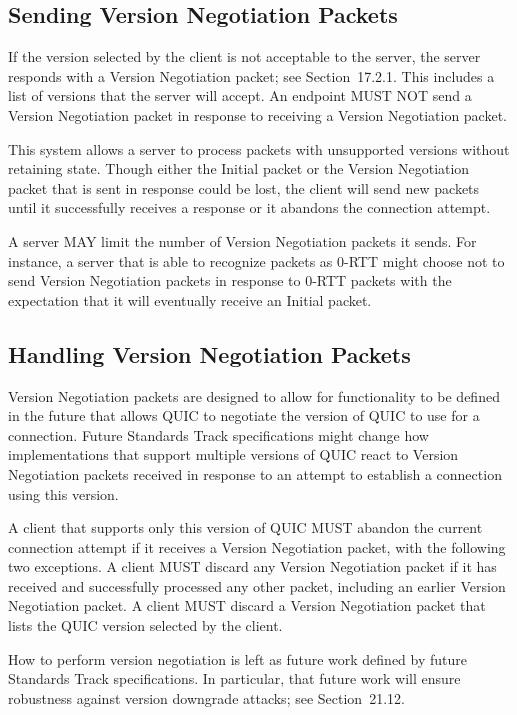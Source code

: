 \documentclass{article}
\begin{document}
\subsection{Sending Version Negotiation Packets}

If the version selected by the client is not acceptable to the server, the server responds with a Version Negotiation packet; see Section~17.2.1.  This includes a list of versions that the server will accept.  An endpoint MUST NOT send a Version Negotiation packet in response to receiving a Version Negotiation packet.

This system allows a server to process packets with unsupported versions without retaining state.  Though either the Initial packet or the Version Negotiation packet that is sent in response could be lost, the client will send new packets until it successfully receives a response or it abandons the connection attempt.

A server MAY limit the number of Version Negotiation packets it sends.  For instance, a server that is able to recognize packets as 0-RTT might choose not to send Version Negotiation packets in response to 0-RTT packets with the expectation that it will eventually receive an Initial packet.

\subsection{Handling Version Negotiation Packets}

Version Negotiation packets are designed to allow for functionality to be defined in the future that allows QUIC to negotiate the version of QUIC to use for a connection.  Future Standards Track specifications might change how implementations that support multiple versions of QUIC react to Version Negotiation packets received in response to an attempt to establish a connection using this version.

A client that supports only this version of QUIC MUST abandon the current connection attempt if it receives a Version Negotiation packet, with the following two exceptions.  A client MUST discard any Version Negotiation packet if it has received and successfully processed any other packet, including an earlier Version Negotiation packet.  A client MUST discard a Version Negotiation packet that lists the QUIC version selected by the client.

How to perform version negotiation is left as future work defined by future Standards Track specifications.  In particular, that future work will ensure robustness against version downgrade attacks; see Section~21.12.
\end{document}
